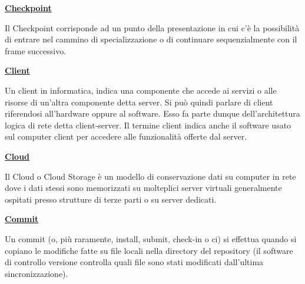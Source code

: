 \vspace*{2\bigskipamount}

\begin{addmargin}[0em]{0em}
	\textbf{\underline{Checkpoint}}
\end{addmargin}

\medskip
\begin{addmargin}[5em]{1em}
	Il Checkpoint corrisponde ad un punto della presentazione in cui c'è la possibilità di entrare nel cammino di specializzazione o di continuare sequenzialmente con il frame successivo.  	
\end{addmargin}	

\bigskip
\begin{addmargin}[0em]{0em}
	\textbf{\underline{Client}}
\end{addmargin}

\medskip
\begin{addmargin}[5em]{1em}
	Un client in informatica, indica una componente che accede ai servizi o alle risorse di un'altra componente detta server. Si può quindi parlare di client riferendosi all'hardware oppure al software. Esso fa parte dunque dell'architettura logica di rete detta client-server.
Il termine client indica anche il software usato sul computer client per accedere alle funzionalità offerte dal server.	
\end{addmargin}		

\bigskip
\begin{addmargin}[0em]{0em}
	\textbf{\underline{Cloud}}
\end{addmargin}
	
\medskip
	\begin{addmargin}[5em]{1em}
Il Cloud o Cloud Storage è un modello di conservazione dati su computer in rete dove i dati stessi sono memorizzati su molteplici server virtuali generalmente ospitati presso strutture di terze parti o su server dedicati.	
\end{addmargin}	

\bigskip
\begin{addmargin}[0em]{0em}	
	\textbf{\underline{Commit}}
\end{addmargin}

\medskip
\begin{addmargin}[5em]{1em}	
Un commit (o, più raramente, install, submit, check-in o ci) si effettua quando si copiano le modifiche fatte su file locali nella directory del repository (il software di controllo versione controlla quali file sono stati modificati dall'ultima sincronizzazione).
\end{addmargin}

